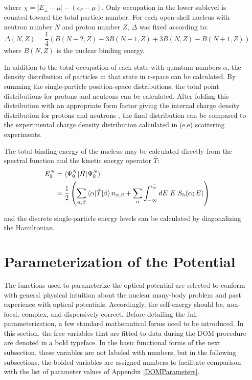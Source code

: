 \noindent
where $\chi = |E_{\pm}-\mu| - (\epsilon_{F} - \mu)$. Only occupation in the
lower sublevel is counted toward the total particle number. For each open-shell
nucleus with neutron number $N$ and proton number $Z$, $\Delta$ was fixed according to:
\begin{equation}
    \Delta(N,Z) = \frac{1}{4}\left(B(N-2,Z)-3B(N-1,Z) + 3B(N,Z)-B(N+1,Z)\right)
\end{equation}
\noindent
where $B(N,Z)$ is the nuclear binding energy.

In addition to the total occupation of each state with quantum numbers $\alpha$,
the density distribution of particles in that state in r-space can be calculated. By summing the
single-particle position-space distributions, the total point distributions for
protons and neutrons can be calculated.
After folding this distribution with an appropriate form factor giving the internal charge density
distribution for protons and neutrons \cite{FormFactorPaper}, the final distribution can be compared
to the experimental charge density distribution calculated in (e,e) scattering experiments.

The total binding energy of the nucleus may be calculated directly from the spectral function and the
kinetic energy operator $\hat{T}$:
\begin{equation} \label{TotalEnergyEquation}
    \begin{split}
        E^{N}_{0} & = \braket{\Psi^{N}_{0}|\hat{H}|\Psi^{N}_{0}}\\
        & = \frac{1}{2} \left(\sum_{\alpha,\beta}\braket{\alpha|\hat{T}|\beta}n_{\alpha,\beta}
        + \sum_{\alpha}\int_{-\infty}^{\epsilon_{F}^{-}}dE\ E\ S_{h}(\alpha;E)\right)
    \end{split}
\end{equation}

\noindent
and the discrete single-particle energy levels can be calculated by diagonalizing the
Hamiltonian.

\section{Parameterization of the Potential}
The functions used to parameterize the optical potential
are selected to conform with general physical intuition about the nuclear
many-body problem and past experience with optical potentials. Accordingly,
the self-energy should be, non-local, complex, and dispersively correct.
Before detailing the full parameterization,
a few standard mathematical forms need to be introduced. In this section, the free variables that
are fitted to data during the DOM procedure are denoted in a bold typeface. In the basic functional
forms of the next subsection, these variables are not labeled with numbers,
but in the following subsections, the bolded
variables are assigned numbers to facilitate comparison with the
list of parameter values of Appendix \ref{DOMParameters}.

